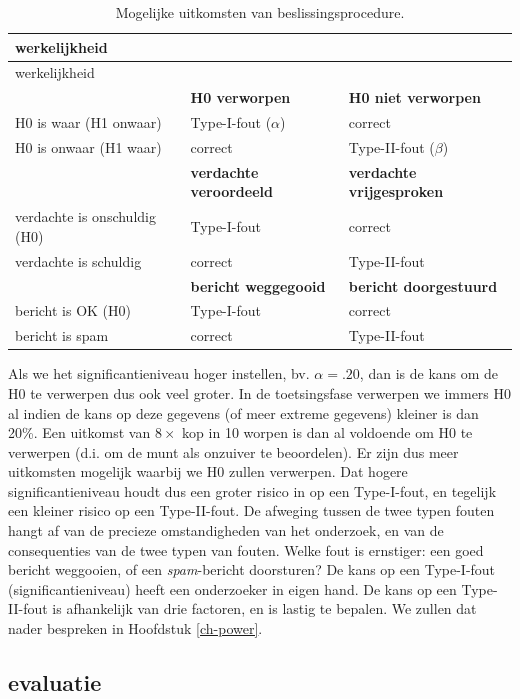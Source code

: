 \documentclass[
]{book}
\begin{document}
\begin{longtable}[]{@{}lll@{}}
\caption{\label{tab:H0H1uitkomsten} Mogelijke uitkomsten van beslissingsprocedure.}\tabularnewline
\toprule\noalign{}
werkelijkheid & & \\
\midrule\noalign{}
\endfirsthead
\toprule\noalign{}
werkelijkheid & & \\
\midrule\noalign{}
\endhead
\bottomrule\noalign{}
\endlastfoot
& \textbf{H0 verworpen} & \textbf{H0 niet verworpen} \\
H0 is waar (H1 onwaar) & Type-I-fout (\(\alpha\)) & correct \\
H0 is onwaar (H1 waar) & correct & Type-II-fout (\(\beta\)) \\
& \textbf{verdachte veroordeeld} & \textbf{verdachte vrijgesproken} \\
verdachte is onschuldig (H0) & Type-I-fout & correct \\
verdachte is schuldig & correct & Type-II-fout \\
& \textbf{bericht weggegooid} & \textbf{bericht doorgestuurd} \\
bericht is OK (H0) & Type-I-fout & correct \\
bericht is spam & correct & Type-II-fout \\
\end{longtable}

Als we het significantieniveau hoger instellen, bv. \(\alpha = .20\), dan
is de kans om de H0 te verwerpen dus ook veel groter. In de
toetsingsfase verwerpen we immers H0 al indien de kans op deze gegevens
(of meer extreme gegevens) kleiner is dan 20\%. Een uitkomst van
\(8\times\) kop in 10 worpen is dan al voldoende om H0 te verwerpen (d.i.
om de munt als onzuiver te beoordelen). Er zijn dus meer uitkomsten
mogelijk waarbij we H0 zullen verwerpen. Dat hogere significantieniveau
houdt dus een groter risico in op een Type-I-fout, en tegelijk een
kleiner risico op een Type-II-fout. De afweging tussen de twee typen
fouten hangt af van de precieze omstandigheden van het onderzoek, en van
de consequenties van de twee typen van fouten. Welke fout is ernstiger:
een goed bericht weggooien, of een \emph{spam}-bericht doorsturen? De kans op
een Type-I-fout (significantieniveau) heeft een onderzoeker in eigen
hand. De kans op een Type-II-fout is afhankelijk van drie factoren, en
is lastig te bepalen. We zullen dat nader bespreken in
Hoofdstuk \ref{ch-power}.

\subsection{evaluatie}\label{evaluatie}
\end{document}
